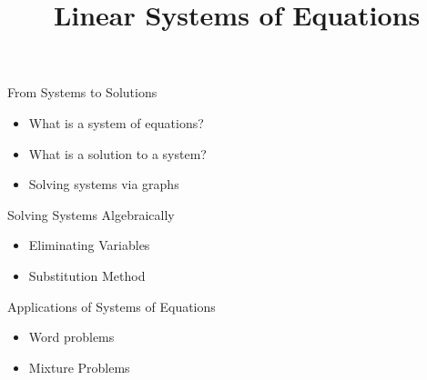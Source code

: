 \documentclass{ximera}
\author{}
\title{Linear Systems of Equations}
\begin{document}
\begin{abstract}
\end{abstract}
\maketitle


\begin{objectives}

\item From Systems to Solutions
\begin{itemize}
	\item What is a system of equations? 
	\item What is a solution to a system? 
	\item Solving systems via graphs 
\end{itemize}

\item Solving Systems Algebraically
\begin{itemize}
	\item Eliminating Variables 
	\item Substitution Method 
\end{itemize}


\item Applications of Systems of Equations
\begin{itemize}
	\item Word problems
	\item Mixture Problems
\end{itemize}


\end{objectives}
\end{document}
